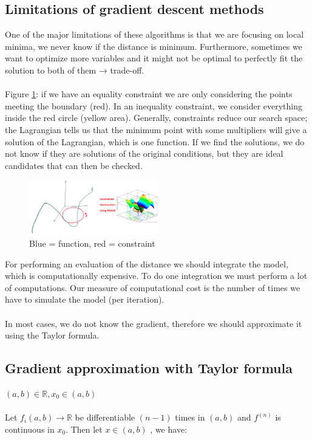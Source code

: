 \subsection{Limitations of gradient descent methods}

One of the major limitations of these algorithms is that we are focusing
on local minima, we never know if the distance is minimum. Furthermore,
sometimes we want to optimize more variables and it might not be optimal
to perfectly fit the solution to both of them → trade-off.
\\
\\
\noindent
Figure \ref{fig:ex}: if we have an equality constraint we are only considering the points
meeting the boundary (red). In an inequality constraint, we consider
everything inside the red circle (yellow area). Generally, constraints
reduce our search space; the Lagrangian tells us that the minimum point
with some multipliers will give a solution of the Lagrangian, which is
one function. If we find the solutions, we do not know if they are
solutions of the original conditions, but they are ideal candidates that
can then be checked.

\begin{figure}
\centering
\includegraphics[width=0.5\textwidth]{example.png}
\caption{Blue = function, red = constraint}
\label{fig:ex}
\end{figure}
\noindent
For performing an evaluation of the distance we should integrate the
model, which is computationally expensive. To do one integration we must
perform a lot of computations. Our measure of computational cost is the
number of times we have to simulate the model (per iteration).
\\
\\
\noindent
In most cases, we do not know the gradient, therefore we should
approximate it using the Taylor formula.


\subsection{Gradient approximation with Taylor formula}

$(a,b) \in \mathbb{R}, x_0 \in (a,b)$
\\
\\
\noindent
Let $f_i(a,b) \rightarrow \mathbb{R}$ be differentiable $(n-1)$ times in
$(a,b)$ and $f^{(n)}$ is continuous in $x_0$. Then let $x \in (a,b)$ ,
we have:

